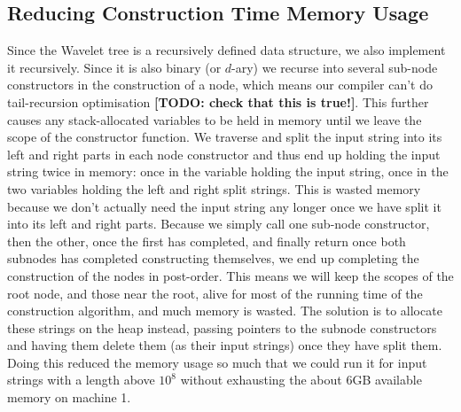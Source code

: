 \subsection{Reducing Construction Time Memory Usage}
Since the Wavelet tree is a recursively defined data structure, we also implement it recursively. 
Since it is also binary (or $d$-ary) we recurse into several sub-node constructors in the construction of a node, which means our compiler can't do tail-recursion optimisation \textbf{[TODO: check that this is true!]}. 
This further causes any stack-allocated variables to be held in memory until we leave the scope of the constructor function.
We traverse and split the input string into its left and right parts in each node constructor and thus end up holding the input string twice in memory: once in the variable holding the input string, once in the two variables holding the left and right split strings.
This is wasted memory because we don't actually need the input string any longer once we have split it into its left and right parts.
Because we simply call one sub-node constructor, then the other, once the first has completed, and finally return once both subnodes has completed constructing themselves, we end up completing the construction of the nodes in post-order.
This means we will keep the scopes of the root node, and those near the root, alive for most of the running time of the construction algorithm, and much memory is wasted.
The solution is to allocate these strings on the heap instead, passing pointers to the subnode constructors and having them delete them (as their input strings) once they have split them.
Doing this reduced the memory usage so much that we could run it for input strings with a length above $10^8$ without exhausting the about 6GB available memory on machine 1.


